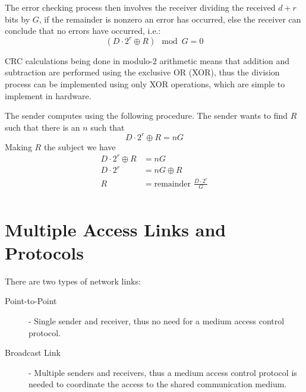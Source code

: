 \documentclass[12pt letter]{report}
\begin{document}
The error checking process then involves the receiver dividing the
received $d + r$ bits by $G$, if the remainder is nonzero an error
has occurred, else the receiver can conclude that no errors have occurred, i.e.:
\[
  \left(D \cdot 2^r \oplus  R \right) \mod G = 0
\]

CRC calculations being done in modulo-2 arithmetic means that
addition and subtraction are performed using the exclusive OR (XOR),
thus the division process can be implemented using only XOR
operations, which are simple to implement in hardware.

The sender computes using the following procedure. The sender wants
to find $R$ such that there is an $n$ such that
\[
  D \cdot 2^r \oplus R = nG
\]
Making $R$ the subject we have
\begin{align*}
  D \cdot 2^r \oplus R &= nG\\
  D\cdot 2^r &= nG \oplus R \\
  R &= \text{remainder } \frac{D\cdot 2^r}{G} \\
\end{align*}


\chapter{Multiple Access Links and Protocols}

There are two types of network links:
\begin{description}
  \item[Point-to-Point] - Single sender and receiver, thus no need
    for a medium access control
    protocol.
  \item[Broadcast Link] - Multiple senders and receivers, thus a
    medium access control protocol is needed to coordinate the access
    to the shared communication medium.
\end{description}
\end{document}
